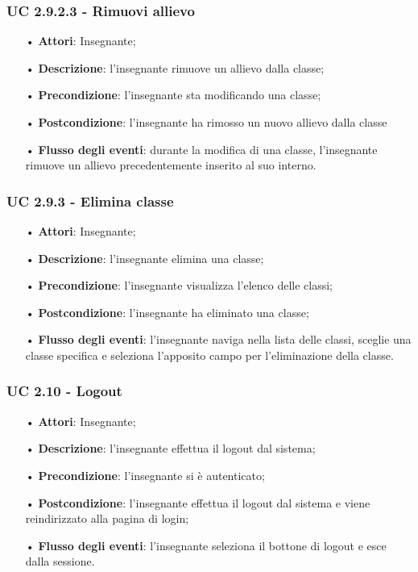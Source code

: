 \subsubsection{UC 2.9.2.3 - Rimuovi allievo}
\begin{itemize}
	\item[•] \textbf{Attori}: Insegnante;
	\item[•] \textbf{Descrizione}: l'insegnante rimuove un allievo dalla classe;
	\item[•] \textbf{Precondizione}: l'insegnante sta modificando una classe;
	\item[•] \textbf{Postcondizione}: l'insegnante ha rimosso un nuovo allievo dalla classe
	\item[•] \textbf{Flusso degli eventi}: durante la modifica di una classe, l'insegnante rimuove un allievo precedentemente inserito al suo interno.
\end{itemize}


\subsubsection{UC 2.9.3 - Elimina classe}
\begin{itemize}
	\item[•] \textbf{Attori}: Insegnante;
	\item[•] \textbf{Descrizione}: l'insegnante elimina una classe;
	\item[•] \textbf{Precondizione}: l'insegnante visualizza l'elenco delle classi;
	\item[•] \textbf{Postcondizione}: l'insegnante ha eliminato una classe;
	\item[•] \textbf{Flusso degli eventi}:  l'insegnante naviga nella lista delle classi, sceglie una classe specifica e seleziona l'apposito campo per l'eliminazione della classe.
\end{itemize}

\subsubsection{UC 2.10 - Logout}
\begin{itemize}
	\item[•] \textbf{Attori}: Insegnante;
	\item[•] \textbf{Descrizione}:  l'insegnante effettua il logout dal sistema;
	\item[•] \textbf{Precondizione}: l'insegnante si è autenticato;
	\item[•] \textbf{Postcondizione}: l’insegnante effettua il logout dal sistema e viene reindirizzato alla pagina di login;
	\item[•] \textbf{Flusso degli eventi}: l’insegnante seleziona il bottone di logout e esce dalla sessione.
\end{itemize}

